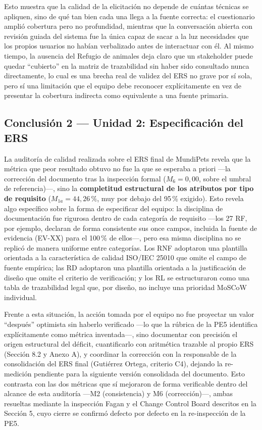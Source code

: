 \documentclass[journal,onecolumn]{IEEEtran}
\begin{document}
	Esto muestra que la calidad de la elicitación no depende de cuántas
	técnicas se apliquen, sino de qué tan bien cada una llega a la fuente
	correcta: el cuestionario amplió cobertura pero no profundidad, mientras
	que la conversación abierta con revisión guiada del sistema fue la única
	capaz de sacar a la luz necesidades que los propios usuarios no habían
	verbalizado antes de interactuar con él. Al mismo tiempo, la ausencia del
	Refugio de animales deja claro que un stakeholder puede quedar
	``cubierto'' en la matriz de trazabilidad sin haber sido consultado nunca
	directamente, lo cual es una brecha real de validez del ERS no grave
	por sí sola, pero sí una limitación que el equipo debe reconocer
	explícitamente en vez de presentar la cobertura indirecta como
	equivalente a una fuente primaria.
	
	
	
	\subsection*{Conclusión 2 --- Unidad 2: Especificación del ERS}
	
		La auditoría de calidad realizada sobre el ERS final de MundiPets revela que la métrica que peor resultado obtuvo no fue la que se esperaba a priori ---la corrección del documento tras la inspección formal ($M_6 = 0{,}00$, sobre el umbral de referencia)---, sino la \textbf{completitud estructural de los atributos por tipo de requisito} ($M_{1a} = 44{,}26\,\%$, muy por debajo del 95\,\% exigido). Esto revela algo específico sobre la forma de especificar del equipo: la disciplina de documentación fue rigurosa dentro de cada categoría de requisito ---los 27 RF, por ejemplo, declaran de forma consistente sus once campos, incluida la fuente de evidencia (EV-XX) para el 100\,\% de ellos---, pero esa misma disciplina no se replicó de manera uniforme entre categorías. Los RNF adoptaron una plantilla orientada a la característica de calidad ISO/IEC 25010 que omite el campo de fuente empírica; las RD adoptaron una plantilla orientada a la justificación de diseño que omite el criterio de verificación; y los RL se estructuraron como una tabla de trazabilidad legal que, por diseño, no incluye una prioridad MoSCoW individual.
	
	Frente a esta situación, la acción tomada por el equipo no fue proyectar un valor ``después'' optimista sin haberlo verificado ---lo que la rúbrica de la PE5 identifica explícitamente como métrica inventada---, sino documentar con precisión el origen estructural del déficit, cuantificarlo con aritmética trazable al propio ERS (Sección 8.2 y Anexo A), y coordinar la corrección con la responsable de la consolidación del ERS final (Gutiérrez Ortega, criterio C4), dejando la re-medición pendiente para la siguiente versión consolidada del documento. Esto contrasta con las dos métricas que sí mejoraron de forma verificable dentro del alcance de esta auditoría ---M2 (consistencia) y M6 (corrección)---, ambas resueltas mediante la inspección Fagan y el Change Control Board descritos en la Sección 5, cuyo cierre se confirmó defecto por defecto en la re-inspección de la PE5.
	
\end{document}
